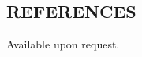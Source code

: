 \documentclass[line,margin]{res}
\begin{document}
\begin{resume}
  \section{REFERENCES}
  Available upon request.
                
\end{resume}
\end{document}
